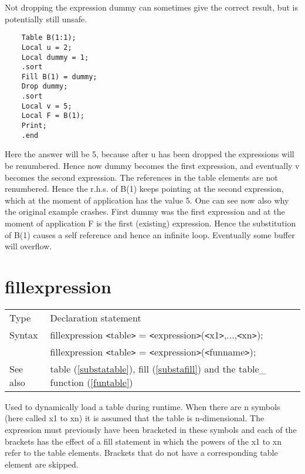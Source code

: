 \noindent Not dropping the expression dummy can sometimes give the correct 
result, but is potentially still unsafe. 
\begin{verbatim}
    Table B(1:1);
    Local u = 2;
    Local dummy = 1;
    .sort
    Fill B(1) = dummy;
    Drop dummy;
    .sort
    Local v = 5;
    Local F = B(1);
    Print;
    .end
\end{verbatim}
Here the answer will be 5, because after u has been dropped the expressions 
will be renumbered. Hence now dummy becomes the first expression, and 
eventually v becomes the second expression. The references in the table 
elements are not renumbered. Hence the r.h.s. of B(1) keeps pointing at the 
second expression, which at the moment of application has the value 5. One 
can see now also why the original example crashes. First dummy was the 
first expression and at the moment of application F is the first (existing) 
expression. Hence the substitution of B(1) causes a self reference and 
hence an infinite loop. Eventually some buffer will 
overflow.
\vspace{10mm}

 
\section{fillexpression}
\label{substafillexpression}

\noindent \begin{tabular}{ll}
Type & Declaration statement\\
Syntax & fillexpression {\tt<}table{\tt>} = {\tt<}expression{\tt>}({\tt<}x1{\tt>},...,{\tt<}xn{\tt>});
\\     & fillexpression {\tt<}table{\tt>} = {\tt<}expression{\tt>}({\tt<}funname{\tt>});
\\ See also & table (\ref{substatable}), 
                fill (\ref{substafill}) and the table\_ function 
(\ref{funtable})
\end{tabular}\vspace{4mm}

\noindent Used to dynamically
load a table during runtime. When 
there are n symbols (here called x1 to xn) it is assumed that the table is 
n-dimensional. The expression must previously have been bracketed in these 
symbols and each of the brackets has the effect of a 
fill statement in which the powers of the x1 to xn refer to the 
table elements. Brackets that do not have a corresponding table element are 
skipped.

